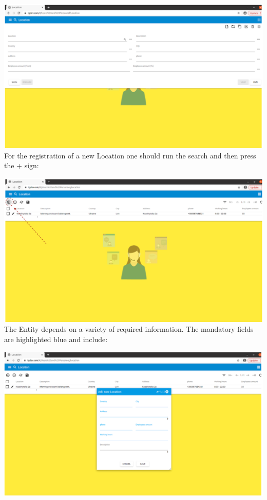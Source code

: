 \includegraphics[width=\textwidth]{sections/01-chapter/images/location1.png}\\

For the registration of a new Location one should run the search and then press the + sign:

\includegraphics[width=\textwidth]{sections/01-chapter/images/location2.png}\\

The Entity depends on a variety of required information. The mandatory fields are highlighted blue and include:

\includegraphics[width=\textwidth]{sections/01-chapter/images/location3.png}\\

